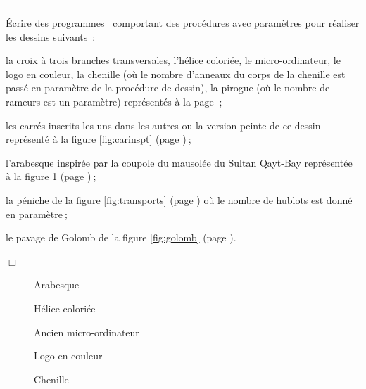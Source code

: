 \noindent \rule{137mm}{0.1mm} %
\begin{exercices}{Écrire des programmes \ocaml\ comportant des procédures avec
paramètres pour réaliser les dessins suivants~:

\tiret la croix à trois branches transversales, l'hélice coloriée, le mi\-cro-\-or\-di\-na\-teur,
le logo en couleur, la chenille (où le nombre
d'anneaux du corps de la chenille est passé en paramètre de la procédure de dessin), la pirogue 
(où le nombre de rameurs est un paramètre) représentés à la page \pageref{fig:crx3b}$\:$;

\tiret les carrés inscrits les uns dans les autres
ou la version peinte de ce dessin représenté à la figure \ref{fig:carinspt} (page \pageref{fig:carinspt})$\:$;

\tiret l'arabesque inspirée par la coupole du mausolée du Sultan
         Qayt-\-Bay re\-pré\-sen\-tée à la figure \ref{fig:arab2} (page \pageref{fig:arab2})$\:$;

\tiret la péniche de la figure \ref{fig:transports} (page \pageref{fig:transports}) où le nombre
         de hublots est donné en paramètre$\:$;

\tiret le pavage de Golomb de la figure \ref{fig:golomb} (page \pageref{fig:golomb}).

\noindent $\Box$}\end{exercices}
\twocolumn
\begin{figure}[h]
 \caption{Arabesque}\label{fig:arab2}
\end{figure}
\vfill
\begin{figure}[h]
 \caption{Hélice coloriée}
\end{figure}
\vfill
\begin{figure}[h]
 \caption{Ancien micro-ordinateur}
\end{figure}
\mbox{}
\newpage
\begin{figure}[!h]
%
\caption{Logo en couleur}%
\end{figure}
\begin{figure}[!h]
%
\caption{Chenille}%
\end{figure}

